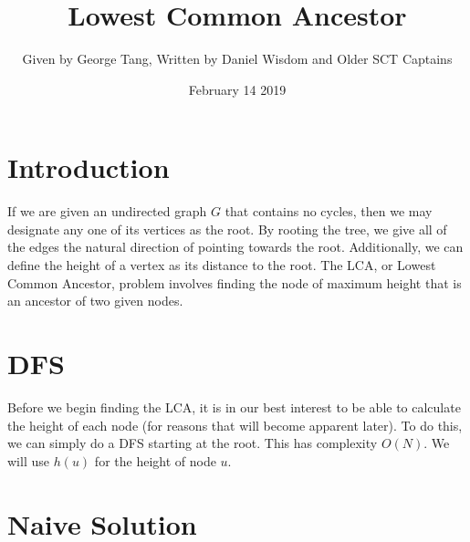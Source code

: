 \documentclass{article}
\title{Lowest Common Ancestor}
\author{Given by George Tang, Written by Daniel Wisdom and Older SCT Captains}
\date{February 14 2019}
\begin{document}
\maketitle

\section{Introduction}
If we are given an undirected graph $G$ that contains no cycles, then we may designate any one of its vertices as the root. By rooting the tree, we give all of the edges the natural direction of pointing towards the root. Additionally, we can define the height of a vertex as its distance to the root. The LCA, or Lowest Common Ancestor, problem involves finding the node of maximum height that is an ancestor of two given nodes.  

\begin{figure}[H]
\centering
{}
\end{figure}


\section{DFS}

Before we begin finding the LCA, it is in our best interest to be able to calculate the height of each node (for reasons that will become apparent later). To do this, we can simply do a DFS starting at the root. This has complexity $O(N)$. We will use $h(u)$ for the height of node $u$.


\section {Naive Solution}
\end{document}
